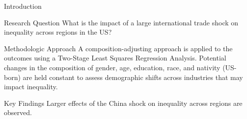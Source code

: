 \begin{frame}{Introduction}

    \begin{block}{Research Question}
        What is the impact of a large international trade shock on inequality across regions in the US?
    \end{block}

    \begin{block}{Methodologic Approach}
        A composition-adjusting approach is applied to the outcomes using a Two-Stage Least Squares Regression Analysis. Potential changes in the composition of gender, age, education, race, and nativity (US-born) are held constant to assess demographic shifts across industries that may impact inequality.
    \end{block}

    \begin{block}{Key Findings}
        Larger effects of the China shock on inequality across regions are observed.
    \end{block}
\end{frame}